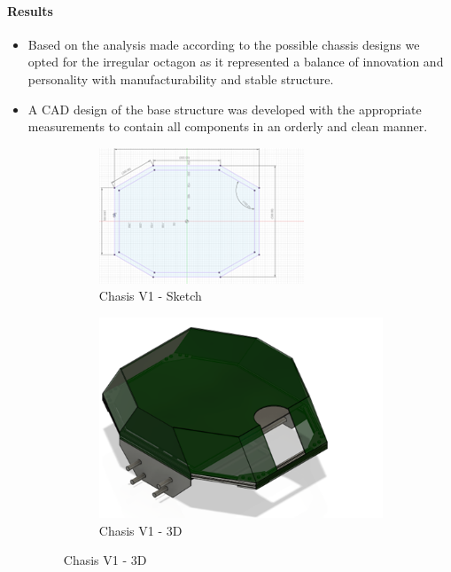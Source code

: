 \documentclass{article}
\begin{document}
\paragraph{Results}
\begin{itemize}
    \item Based on the analysis made according to the possible chassis designs we opted for the irregular octagon as it represented a balance of innovation and personality with manufacturability and stable structure.
    \item A CAD design of the base structure was developed with the appropriate measurements to contain all components in an orderly and clean manner.
    
    \begin{figure}[H]
        \centering
        \begin{subfigure}{.5\textwidth}
          \centering
          \includegraphics[width=.9\linewidth]{Images/Chasis/SketchV1.png}
          \caption{Chasis V1 - Sketch}
          
        \end{subfigure}%
        \begin{subfigure}{.5\textwidth}
          \centering
          \includegraphics[width=.9\linewidth]{Images/Chasis/ChasisV1.png}
          \caption{Chasis V1 - 3D}
          

\end{subfigure}
\end{figure}
\end{itemize}
\end{document}
